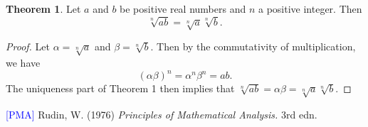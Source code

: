 \documentclass[12pt]{article}
\theoremstyle{definition}
\newtheorem{theorem}{Theorem}
\begin{document}
\begin{theorem}

Let \( a \) and \( b \) be positive real numbers and \( n \) a positive integer. Then
\[
\sqrt[n]{ab} = \sqrt[n]{a}\sqrt[n]{b}.
\]

\end{theorem}

\begin{proof}

Let \( \alpha = \sqrt[n]{a} \) and \( \beta = \sqrt[n]{b} \). Then by the commutativity of multiplication, we have
\[
(\alpha \beta)^n = \alpha^n \beta^n = ab.
\]
The uniqueness part of Theorem 1 then implies that \( \sqrt[n]{ab} = \alpha \beta = \sqrt[n]{a} \sqrt[n]{b} \).
\end{proof}

\hrulefill

\hypertarget{pma}{\textcolor{blue}{[PMA]} Rudin, W. (1976) \textit{Principles of Mathematical Analysis.} 3rd edn.}
\end{document}
